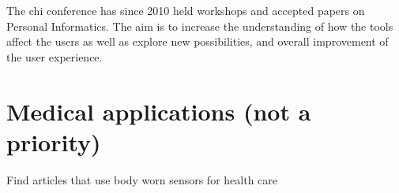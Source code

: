 The \gls{chi} conference has since 2010 \cite{chi2010} held workshops and accepted papers on Personal Informatics. The aim is to increase the understanding of how the tools affect the users as well as explore new possibilities, and overall improvement of the user experience.

\section{Medical applications (not a priority)}
Find articles that use body worn sensors for health care
